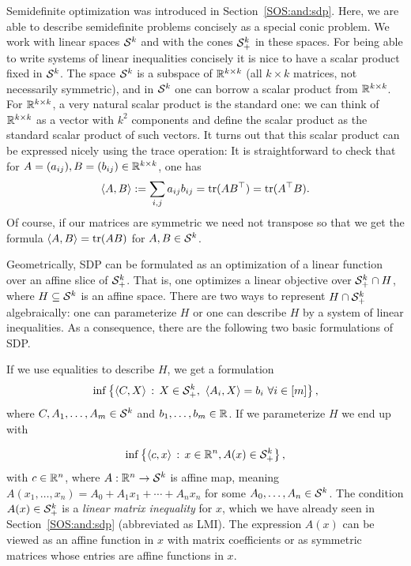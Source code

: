 Semidefinite optimization was introduced in Section~\ref{SOS:and:sdp}. Here, we are able to describe semidefinite problems concisely as a special conic problem. We work with linear spaces $\mathcal{S}^k$ and with the cones $\mathcal{S}_+^k$ in these spaces. For being able to write systems of linear inequalities concisely it is nice to have a scalar product fixed in $\mathcal{S}^k$. The space $\mathcal{S}^k$ is a subspace of $\mathbb{R}^{k \times k}$ (all $k \times k$ matrices, not necessarily symmetric), and in $\mathcal{S}^k$ one can borrow a scalar product from $\mathbb{R}^{k \times k}$. For $\mathbb{R}^{k \times k}$, a very natural scalar product is the standard one: we can think of $\mathbb{R}^{k \times k}$ as a vector with $k^2$ components and define the scalar product as the standard scalar product of such vectors. It turns out that this scalar product can be expressed nicely using the trace operation: It is straightforward to check that for $A = (a_{ij}), B= (b_{ij}) \in \mathbb{R}^{k \times k}$, one has 
\[
	\left\langle A , B \right\rangle:= \sum_{i,j} a_{ij} b_{ij} = \operatorname{tr}(A B^\top) = \operatorname{tr}(A^\top B).
\] Of course, if our matrices are symmetric we need not transpose so that we get the formula $\left\langle A , B \right\rangle = \operatorname{tr}(A B)$ for $A, B \in \mathcal{S}^k$. 


Geometrically, SDP can be formulated as an optimization of a linear function over an affine slice of $\mathcal{S}_+^k$. That is, one optimizes a linear objective over $\mathcal{S}_+^k \cap H$, where $H \subseteq \mathcal{S}^k$ is an affine space. There are two ways to represent $H \cap \mathcal{S}_+^k$ algebraically: one can parameterize $H$ or one can describe $H$ by a system of linear inequalities. As a consequence, there are the following two basic formulations of SDP.

If we use equalities to describe $H$, we get a formulation
\[
	\inf \left\{  \left\langle C , X \right\rangle  \,:\,  X \in \mathcal{S}_+^k, \ \left\langle A_i , X \right\rangle = b_i \ \forall i \in [m] \right\},
\]
where $C, A_1,\ldots,A_m \in \mathcal{S}^k$ and $b_1,\ldots,b_m \in \mathbb{R}$. If we parameterize $H$ we end up with 

\[
	\inf \left\{  \left\langle c , x \right\rangle \,:\, x \in \mathbb{R}^n, A(x) \in \mathcal{S}_+^k \right\},
\]
with $c \in \mathbb{R}^n$, where $A : \mathbb{R}^n \to \mathcal{S}^k$ is affine map, meaning  $A(x_1,\ldots,x_n) = A_0 + A_1 x_1 + \cdots + A_n x_n$ for some $A_0,\ldots,A_n \in \mathcal{S}^k$. The condition $A(x) \in \mathcal{S}_+^k$ is a \emph{linear matrix inequality} for $x$, which we have already seen in Section~\ref{SOS:and:sdp}
(abbreviated as LMI). The expression $A(x)$ can be viewed as an affine function in $x$ with matrix coefficients or as symmetric matrices whose entries are affine functions in $x$.

